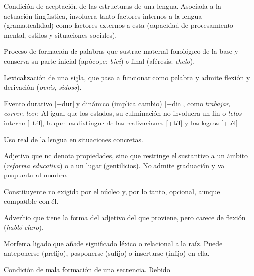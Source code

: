
\begin{glosariogeneral}
  \item[Aceptabilidad:] Condición de aceptación de las estructuras de una
        lengua. Asociada a la actuación lingüística, involucra tanto factores
        internos a la lengua (gramaticalidad) como factores externos a esta
        (capacidad de procesamiento mental, estilos y situaciones sociales).
  \item[Acortamiento:] Proceso de formación de palabras que sustrae material
        fonológico de la base y conserva su parte inicial (apócope:
        \textit{bici}) o final (aféresis: \textit{chelo}).
  \item[Acronimia:] Lexicalización de una sigla, que pasa a funcionar como
        palabra y admite flexión y derivación (\textit{ovnis}, \textit{sidoso}).
  \item[Actividad:] Evento durativo [+dur] y dinámico (implica cambio) [+din],
        como \textit{trabajar, correr, leer}. Al igual que los estados, su
        culminación no involucra un fin o \textit{telos} interno [--tél], lo que
        los distingue de las realizaciones [+tél] y los logros [+tél].
  \item[Actuación:] Uso real de la lengua en situaciones concretas.
  \item[Adjetivo relacional:] Adjetivo que no denota propiedades, sino que
        restringe el sustantivo a un ámbito (\textit{reforma educativa}) o a un
        lugar (gentilicios). No admite graduación y va pospuesto al nombre.
  \item[Adjunto:] Constituyente no exigido por el núcleo y, por lo tanto,
        opcional, aunque compatible con él.
  \item[Adverbio adjetival:] Adverbio que tiene la forma del adjetivo del que
        proviene, pero carece de flexión (\textit{habló claro}).
  \item[Afijo:] Morfema ligado que añade significado léxico o relacional a la
        raíz. Puede anteponerse (prefijo), posponerse (sufijo) o insertarse
        (infijo) en ella.
  \item[Agramaticalidad:] Condición de mala formación de una secuencia. Debido

\end{glosariogeneral}
